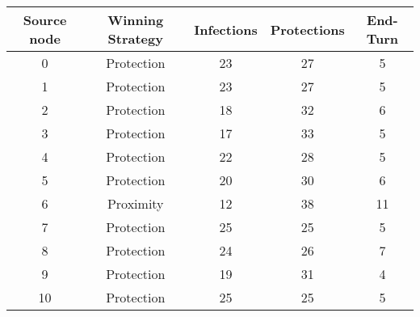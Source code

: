 \documentclass[results.tex]{subfiles}
\begin{document}
    \begin{center}
        \begin{tabular}{| c || c | c | c | c |}
            \hline
            {\bfseries Source node} & {\bfseries Winning Strategy} & {\bfseries Infections} & {\bfseries Protections}
            & {\bfseries End-Turn}
            \\  %
            \hline\hline
            0                       & Protection                   & 23                     & 27                      & 5                    \\
            \hline
            1                       & Protection                   & 23                     & 27                      & 5                    \\
            \hline
            2                       & Protection                   & 18                     & 32                      & 6                    \\
            \hline
            3                       & Protection                   & 17                     & 33                      & 5                    \\
            \hline
            4                       & Protection                   & 22                     & 28                      & 5                    \\
            \hline
            5                       & Protection                   & 20                     & 30                      & 6                    \\
            \hline
            6                       & Proximity                    & 12                     & 38                      & 11                   \\
            \hline
            7                       & Protection                   & 25                     & 25                      & 5                    \\
            \hline
            8                       & Protection                   & 24                     & 26                      & 7                    \\
            \hline
            9                       & Protection                   & 19                     & 31                      & 4                    \\
            \hline
            10                      & Protection                   & 25                     & 25                      & 5                    \\

\end{tabular}
\end{center}
\end{document}
